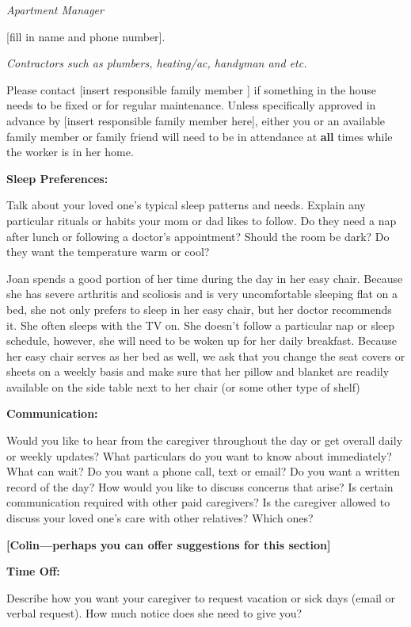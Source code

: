 \documentclass[]{article}
\begin{document}
\emph{Apartment Manager}

{[}fill in name and phone number{]}.

\emph{Contractors such as plumbers, heating/ac, handyman and etc.}

Please contact {[}insert responsible family member {]} if something in
the house needs to be fixed or for regular maintenance. Unless
specifically approved in advance by {[}insert responsible family member
here{]}, either you or an available family member or family friend will
need to be in attendance at \textbf{all} times while the worker is in
her home.

\textbf{Sleep Preferences:}

Talk about your loved one's typical sleep patterns and needs. Explain
any particular rituals or habits your mom or dad likes to follow. Do
they need a nap after lunch or following a doctor's appointment? Should
the room be dark? Do they want the temperature warm or cool?

Joan spends a good portion of her time during the day in her easy chair.
Because she has severe arthritis and scoliosis and is very uncomfortable
sleeping flat on a bed, she not only prefers to sleep in her easy chair,
but her doctor recommends it. She often sleeps with the TV on. She
doesn't follow a particular nap or sleep schedule, however, she will
need to be woken up for her daily breakfast. Because her easy chair
serves as her bed as well, we ask that you change the seat covers or
sheets on a weekly basis and make sure that her pillow and blanket are
readily available on the side table next to her chair (or some other
type of shelf)

\textbf{Communication:}

Would you like to hear from the caregiver throughout the day or get
overall daily or weekly updates? What particulars do you want to know
about immediately? What can wait? Do you want a phone call, text or
email? Do you want a written record of the day? How would you like to
discuss concerns that arise? Is certain communication required with
other paid caregivers? Is the caregiver allowed to discuss your loved
one's care with other relatives? Which ones?

\textbf{{[}Colin---perhaps you can offer suggestions for this
section{]}}

\textbf{Time Off:}

Describe how you want your caregiver to request vacation or sick days
(email or verbal request). How much notice does she need to give you?
\end{document}

